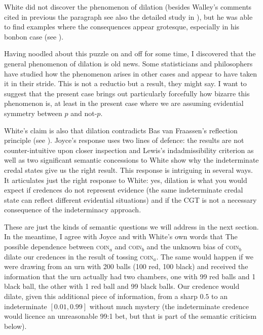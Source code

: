 \documentclass[11pt]{article}
\begin{document}
White did not discover the phenomenon of dilation (besides Walley's
comments cited in previous the paragraph see also the detailed study
in ), but he was able to find
examples where the consequences appear grotesque, especially in his
bonbon case (see ).

\begin{quotex}
  Having noodled about this puzzle on and off for some time, I
  discovered that the general phenomenon of dilation is old news. Some
  statisticians and philosophers have studied how the phenomenon
  arises in other cases and appear to have taken it in their stride.
  This is not a reductio but a result, they might say. I want to
  suggest that the present case brings out particularly forcefully how
  bizarre this phenomenon is, at least in the present case where we
  are assuming evidential symmetry between $p$ and not-$p$.
\end{quotex}

White's claim is also that dilation contradicts Bas van Fraassen's
reflection principle (see ). Joyce's
response uses two lines of defence: the results are not
counter-intuitive upon closer inspection and Lewis's indadmissibility
criterion as well as two significant semantic concessions to White
show why the indeterminate credal states give us the right result.
This response is intriguing in several ways. It articulates just the
right response to White: yes, dilation is what you would expect if
credences do not represent evidence (the same indeterminate credal
state can reflect different evidential situations) and if the CGT is
not a necessary consequence of the indeterminacy approach.

These are just the kinds of semantic questions we will address in the next
section. In the meantime, I agree with Joyce and with White's own words that
 The possible dependence between
\textsc{coin}$_{a}$ and \textsc{coin}$_{b}$ and the unknown bias of
\textsc{coin}$_{b}$ dilate our credences in the result of tossing
\textsc{coin}$_{a}$. The same would happen if we were drawing from an urn with
200 balls (100 red, 100 black) and received the information that the urn
actually had two chambers, one with 99 red balls and 1 black ball, the other
with 1 red ball and 99 black balls. Our credence would dilate, given this
additional piece of information, from a sharp $0.5$ to an indeterminate
$[0.01,0.99]$ without much mystery (the indeterminate credence would licence
an unreasonable 99:1 bet, but that is part of the semantic criticism below). 
\end{document}
